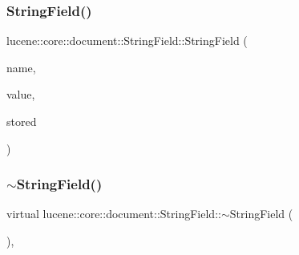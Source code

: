 \mbox{\label{classlucene_1_1core_1_1document_1_1StringField_a33a7cc4352b3c8740bcca051c2ee3021}} 
\subsubsection{\texorpdfstring{String\+Field()}{StringField()}\hspace{0.1cm}{\footnotesize\ttfamily [4/4]}}
{\footnotesize\ttfamily lucene\+::core\+::document\+::\+String\+Field\+::\+String\+Field (\begin{DoxyParamCaption}\item[{\mbox{\hyperlink{ZlibCrc32_8h_a2c212835823e3c54a8ab6d95c652660e}{const}} std\+::string \&}]{name,  }\item[{\mbox{\hyperlink{classlucene_1_1core_1_1util_1_1BytesRef}{lucene\+::core\+::util\+::\+Bytes\+Ref}} \&\&}]{value,  }\item[{\mbox{\hyperlink{ZlibCrc32_8h_a2c212835823e3c54a8ab6d95c652660e}{const}} \mbox{\hyperlink{classlucene_1_1core_1_1document_1_1Field_a7d5d79f0c56d3548ab8d46d0e7dae35d}{Field\+::\+Store}}}]{stored }\end{DoxyParamCaption})\hspace{0.3cm}{\ttfamily [inline]}}

\mbox{\label{classlucene_1_1core_1_1document_1_1StringField_a36b6607f9e292e3d2eb8beded051591e}} 
\subsubsection{\texorpdfstring{$\sim$\+String\+Field()}{~StringField()}}
{\footnotesize\ttfamily virtual lucene\+::core\+::document\+::\+String\+Field\+::$\sim$\+String\+Field (\begin{DoxyParamCaption}{ }\end{DoxyParamCaption})\hspace{0.3cm}{\ttfamily [inline]}, {\ttfamily [virtual]}}



